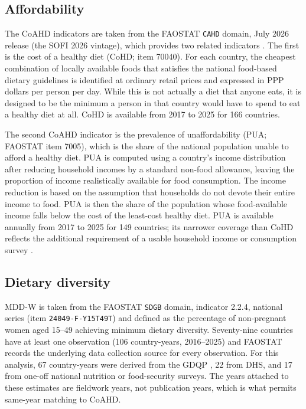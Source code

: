 \documentclass[11pt]{article}
\begin{document}
\subsection{Affordability}
The CoAHD indicators are taken from the FAOSTAT \texttt{CAHD} domain, July 2026 release (the SOFI 2026 vintage), which provides two related indicators \citep{faostat2026}. The first is the cost of a healthy diet (CoHD; item 70040). For each country, the cheapest combination of locally available foods that satisfies the national food-based dietary guidelines is identified at ordinary retail prices and expressed in PPP dollars per person per day.  While this is not actually a diet that anyone eats, it is designed to be the minimum a person in that country would have to spend to eat a healthy diet at all. CoHD is available from 2017 to 2025 for 166 countries.

The second CoAHD indicator is the prevalence of unaffordability (PUA; FAOSTAT item 7005), which is the share of the national population unable to afford a healthy diet.  PUA is computed using a country's income distribution after reducing household incomes by a standard non-food allowance, leaving the proportion of income realistically available for food consumption.  The income reduction is based on the assumption that households do not devote their entire income to food.  PUA is then the share of the population whose food-available income falls below the cost of the least-cost healthy diet.  PUA is available annually from 2017 to 2025 for 149 countries; its narrower coverage than CoHD reflects the additional requirement of a usable household income or consumption survey \citep{herforth2020}.

\subsection{Dietary diversity}
MDD-W is taken from the FAOSTAT \texttt{SDGB} domain, indicator 2.2.4, national series (item \texttt{24049-F-Y15T49T}) and defined as the percentage of non-pregnant women aged 15--49 achieving minimum dietary diversity. Seventy-nine countries have at least one observation (106 country-years, 2016--2025) and FAOSTAT records the underlying data collection source for every observation.  For this analysis, 67 country-years were derived from the GDQP \citep{gdqp}, 22 from DHS, and 17 from one-off national nutrition or food-security surveys. The years attached to these estimates are fieldwork years, not publication years, which is what permits same-year matching to CoAHD.
\end{document}
